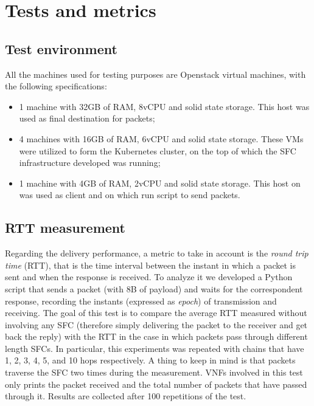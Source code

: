\chapter{Tests and metrics}
\label{chap:tests}

\section{Test environment}
All the machines used for testing purposes are Openstack virtual machines, with
the following specifications:
\begin{itemize}
\item 1 machine with 32GB of RAM, 8vCPU and solid state storage. This host was
used as final destination for packets;
\item 4 machines with 16GB of RAM, 6vCPU and solid state storage. These VMs
were utilized to form the Kubernetes cluster, on the top of which the SFC
infrastructure developed was running;
\item 1 machine with 4GB of RAM, 2vCPU and solid state storage. This host on
was used as client and on which run script to send packets.
\end{itemize}

\section{RTT measurement}
Regarding the delivery performance, a metric to take in account is the
\emph{round trip time} (RTT), that is the time interval between the instant in
which a packet is sent and when the response is received. To analyze it we
developed a Python script that sends a packet (with 8B of payload) and waits for
the correspondent response, recording the instants (expressed as \emph{epoch})
of transmission and receiving. The goal of this test is to compare the average
RTT measured without involving any SFC (therefore simply delivering the packet
to the receiver and get back the reply) with the RTT in the case in which
packets pass through different length SFCs. In particular, this experiments was
repeated with chains that have 1, 2, 3, 4, 5, and 10 hops respectively. A thing
to keep in mind is that packets traverse the SFC two times during the
measurement. VNFs involved in this test only prints the packet received and the
total number of packets that have passed through it. Results are collected
after 100 repetitions of the test.

